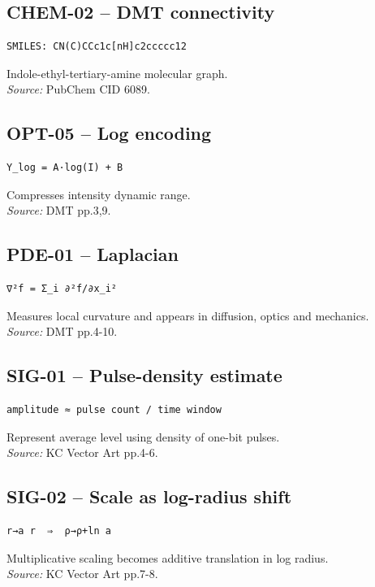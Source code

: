 \documentclass{article}
\begin{document}
\subsection*{CHEM-02 -- DMT connectivity}
\begin{verbatim}
SMILES: CN(C)CCc1c[nH]c2ccccc12
\end{verbatim}
Indole-ethyl-tertiary-amine molecular graph.\\
\textit{Source:} PubChem CID 6089.
\subsection*{OPT-05 -- Log encoding}
\begin{verbatim}
Y_log = A·log(I) + B
\end{verbatim}
Compresses intensity dynamic range.\\
\textit{Source:} DMT pp.3,9.
\subsection*{PDE-01 -- Laplacian}
\begin{verbatim}
∇²f = Σ_i ∂²f/∂x_i²
\end{verbatim}
Measures local curvature and appears in diffusion, optics and mechanics.\\
\textit{Source:} DMT pp.4-10.
\subsection*{SIG-01 -- Pulse-density estimate}
\begin{verbatim}
amplitude ≈ pulse count / time window
\end{verbatim}
Represent average level using density of one-bit pulses.\\
\textit{Source:} KC Vector Art pp.4-6.
\subsection*{SIG-02 -- Scale as log-radius shift}
\begin{verbatim}
r→a r  ⇒  ρ→ρ+ln a
\end{verbatim}
Multiplicative scaling becomes additive translation in log radius.\\
\textit{Source:} KC Vector Art pp.7-8.
\end{document}
